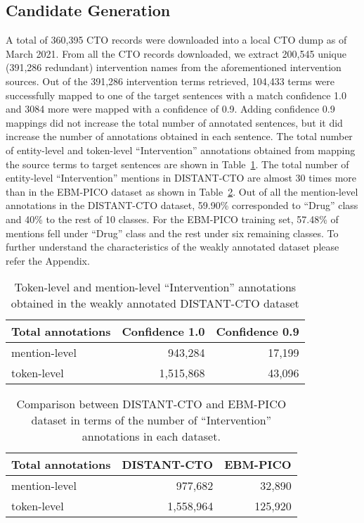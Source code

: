\documentclass[letterpaper]{article} %
\begin{document}
\subsection{Candidate Generation}
\label{subsec:res_cand}
%
A total of 360,395 CTO records were downloaded into a local CTO dump as of March 2021.
From all the CTO records downloaded, we extract 200,545 unique (391,286 redundant) intervention names from the aforementioned intervention sources.
Out of the 391,286 intervention terms retrieved, 104,433 terms were successfully mapped to one of the target sentences with a match confidence 1.0 and 3084 more were mapped with a confidence of 0.9.
Adding confidence 0.9 mappings did not increase the total number of annotated sentences, but it did increase the number of annotations obtained in each sentence.
The total number of entity-level and token-level ``Intervention'' annotations obtained from mapping the source terms to target sentences are shown in Table~\ref{table:res_candgen}.
The total number of entity-level ``Intervention'' mentions in DISTANT-CTO are almost 30 times more than in the EBM-PICO dataset as shown in Table~\ref{table:candcomp}.
Out of all the mention-level annotations in the DISTANT-CTO dataset, 59.90\% corresponded to ``Drug'' class and 40\% to the rest of 10 classes.
For the EBM-PICO training set, 57.48\% of mentions fell under ``Drug'' class and the rest under six remaining classes.
To further understand the characteristics of the weakly annotated dataset please refer the Appendix.
%
\begin{table}[!htbp]
\centering
\begin{tabular}{lrr}
\hline \textbf{Total annotations} & \textbf{Confidence 1.0} & \textbf{Confidence 0.9} \\ \hline
mention-level & 943,284 & 17,199 \\
token-level & 1,515,868 & 43,096 \\
\hline
\end{tabular}
\caption{Token-level and mention-level ``Intervention'' annotations obtained in the weakly annotated DISTANT-CTO dataset}
\label{table:res_candgen} 
\end{table}
%
\begin{table}[!htbp]
\centering
\begin{tabular}{lrr}
\hline \textbf{Total annotations} & \textbf{DISTANT-CTO} & \textbf{EBM-PICO} \\ \hline
mention-level & 977,682 & 32,890\\
token-level & 1,558,964 & 125,920 \\
\hline
\end{tabular}
\caption{Comparison between DISTANT-CTO and EBM-PICO dataset in terms of the number of ``Intervention'' annotations in each dataset.}
\label{table:candcomp} 
\end{table}
\end{document}

